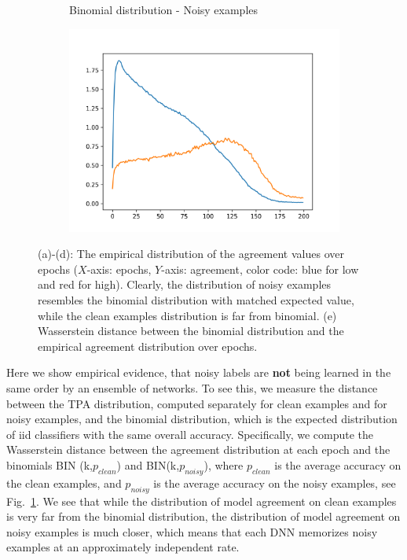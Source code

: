\documentclass{article}
\begin{document}
\begin{figure}[htb]
\begin{subfigure}[tb]{0.49\textwidth}
  \centering
  \caption{Binomial distribution - Noisy examples}
\end{subfigure}
\begin{subfigure}[tb]{.5\textwidth}
  \includegraphics[width=\linewidth]{figs/wass_dist.png}
  \centering
\vspace{-1em}
\caption{}%
 \end{subfigure}
\vspace{-1em}
      \caption{(a)-(d): The empirical distribution of the agreement values over epochs ($X$-axis: epochs, $Y$-axis: agreement, color code: blue for low and red for high). Clearly, the distribution of noisy examples resembles the binomial distribution with matched expected value, while the clean examples distribution is far from binomial. (e) Wasserstein distance between the binomial distribution and the empirical agreement distribution over epochs. }
      \label{fig:binomical}
\end{figure}




Here we show empirical evidence, that noisy labels are \textbf{not} being learned in the same order by an ensemble of networks. To see this, we measure the distance between the TPA distribution, computed separately for clean examples and for noisy examples, and the binomial distribution, which is the expected distribution of iid classifiers with the same overall accuracy. Specifically, we compute the Wasserstein distance between the agreement distribution at each epoch and the binomials BIN (k,$p_{clean}$) and BIN(k,$p_{noisy}$), where $p_{clean}$ is the average accuracy on the clean examples, and $p_{noisy}$ is the average accuracy on the noisy examples, see Fig.~\ref{fig:binomical}. We see that while the distribution of model agreement on clean examples is very far from the binomial distribution, the distribution of model agreement  on noisy examples is much closer, which means that each DNN memorizes noisy examples at an approximately independent rate.
\end{document}
